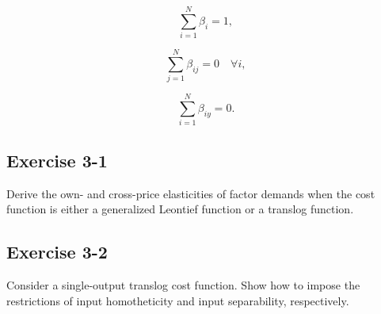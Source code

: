 \[
\sum_{i=1}^N \beta_i = 1,
\]

\[
\sum_{j=1}^N \beta_{ij} = 0 \quad \forall i,
\]

\[
\sum_{i=1}^N \beta_{iy} = 0.
\]


\begin{tcolorbox}[breakable]

\subsection*{Exercise 3-1}

Derive the own- and cross-price elasticities of factor demands when the
cost function is either a generalized Leontief function or a translog function.

\end{tcolorbox}


\begin{tcolorbox}[breakable]

\subsection*{Exercise 3-2}

Consider a single-output translog cost function.
Show how to impose the restrictions of input homotheticity and input separability,
respectively.

\end{tcolorbox}

